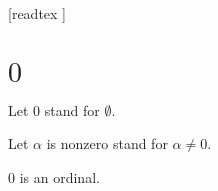\documentclass[10pt]{article}
\begin{document}
  \begin{imports}
    \begin{forthel}
      [readtex ]
    \end{forthel}
  \end{imports}


  \section*{$0$}

  \begin{forthel}
    Let $0$ stand for $\emptyset$.

    Let $\alpha$ is nonzero stand for $\alpha \neq 0$.
  \end{forthel}

  \begin{forthel}
    \begin{proposition}[id=SET_THEORY_02_8483196888940544,printid]
      $0$ is an ordinal.
    \end{proposition}
  \end{forthel}
\end{document}
